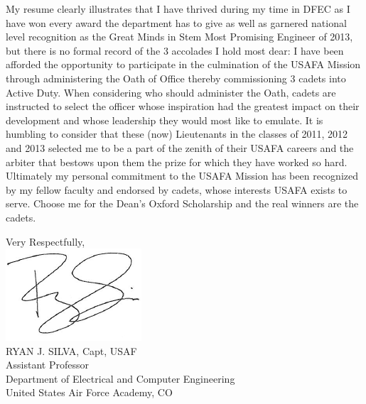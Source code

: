 \documentclass{article}
\begin{document}
My resume clearly illustrates that I have thrived during my time in DFEC as I
have won every award the department has to give as well as garnered national
level recognition as the Great Minds in Stem Most Promising Engineer of 2013,
but there is no formal record of the 3 accolades I hold most dear: I have been
afforded the opportunity to participate in the culmination of the USAFA Mission
through administering the Oath of Office thereby commissioning 3 cadets into
Active Duty. When considering who should administer the Oath, cadets are
instructed to select the officer whose inspiration had the greatest impact on
their development and whose leadership they would most like to emulate. It is
humbling to consider that these (now) Lieutenants in the classes of 2011, 2012
and 2013 selected me to be a part of the zenith of their USAFA careers and the
arbiter that bestows upon them the prize for which they have worked so hard.
Ultimately my personal commitment to the USAFA Mission has been recognized by
my fellow faculty and endorsed by cadets, whose interests USAFA exists to
serve. Choose me for the Dean's Oxford Scholarship and the real winners are the
cadets.

\vspace{10mm}
\hspace*{2.3in} \noindent Very Respectfully, \\
\hspace*{2.5in} \includegraphics[scale=.5]{silvasig}  \\
\hspace*{2.5in} RYAN J. SILVA, Capt, USAF \\
\hspace*{2.5in} Assistant Professor   \\
\hspace*{2.5in} Department of Electrical and Computer Engineering  \\
\hspace*{2.5in} United States Air Force Academy, CO  \\
\renewcommand\contentsname{Attachments}\tableofcontents

\newpage
\end{document}
